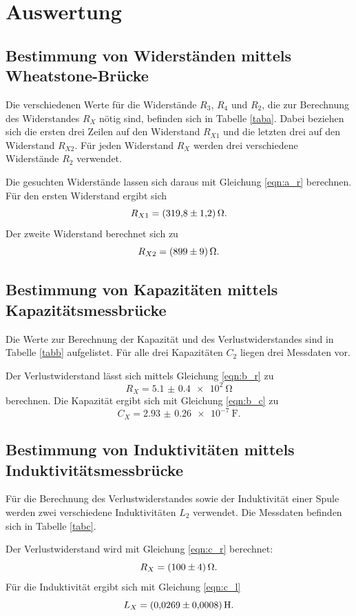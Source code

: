\section{Auswertung}
\label{sec:Auswertung}

\subsection{Bestimmung von Widerständen mittels Wheatstone-Brücke}
Die verschiedenen Werte für die Widerstände $R_3$, $R_4$ und $R_2$, die zur Berechnung des Widerstandes $R_X$
nötig sind, befinden sich in Tabelle \ref{taba}. Dabei beziehen sich die ersten drei Zeilen auf den Widerstand
$R_{X1}$ und die letzten drei auf den Widerstand $R_{X2}$. Für jeden Widerstand $R_X$ werden drei verschiedene
Widerstände $R_2$ verwendet.

\noindent Die gesuchten Widerstände lassen sich daraus mit Gleichung \eqref{eqn:a_r} berechnen.
Für den ersten Widerstand ergibt sich
\begin{equation*}
    R_{X1} = \SI{319.8 \pm 1.2}{\ohm}.
\end{equation*}
Der zweite Widerstand berechnet sich zu
\begin{equation*}
    R_{X2} = \SI{899 \pm 9}{\ohm}.
\end{equation*}

\subsection{Bestimmung von Kapazitäten mittels Kapazitätsmessbrücke}
Die Werte zur Berechnung der Kapazität und des Verlustwiderstandes sind in Tabelle \ref{tabb} aufgelistet.
Für alle drei Kapazitäten $C_2$ liegen drei Messdaten vor.

\noindent Der Verlustwiderstand lässt sich mittels Gleichung \eqref{eqn:b_r} zu
\begin{equation*}
    R_X = \SI{5.1(04)e2}{\ohm}
\end{equation*}
berechnen.
Die Kapazität ergibt sich mit Gleichung \eqref{eqn:b_c} zu
\begin{equation*}
    C_X = \SI{2.93(026)e-7}{\farad}.
\end{equation*}

\subsection{Bestimmung von Induktivitäten mittels Induktivitätsmessbrücke}
Für die Berechnung des Verlustwiderstandes sowie der Induktivität einer Spule werden zwei verschiedene
Induktivitäten $L_2$ verwendet. Die Messdaten befinden sich in Tabelle \ref{tabc}.

\noindent Der Verlustwiderstand wird mit Gleichung \eqref{eqn:c_r} berechnet:
\begin{equation*}
    R_X = \SI{100 \pm 4}{\ohm}.
\end{equation*}
Für die Induktivität ergibt sich mit Gleichung \eqref{eqn:c_l}
\begin{equation*}
    L_X = \SI{0.0269 \pm 0.0008}{\henry}.
\end{equation*}

